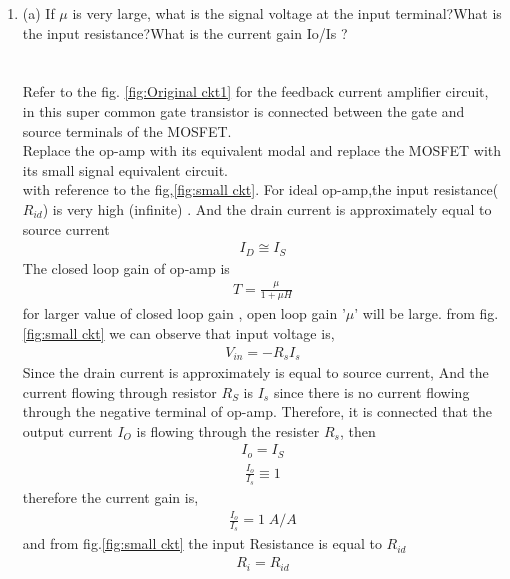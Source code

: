 \begin{enumerate}[label=\thesection.\arabic*.,ref=\thesection.\theenumi]
\item 
\label{Question_1a_ee18btech11023}
(a) If $\mu$ is very large, what is the signal voltage at the input
terminal?What is the input resistance?What is the current
gain Io/Is ?\\
\\
\solution \\
Refer to the fig. \ref{fig:Original ckt1} for the feedback current amplifier circuit, in this super common gate transistor is connected between the gate and source terminals of the MOSFET.\\
Replace the op-amp with its equivalent modal and replace the MOSFET with its small signal equivalent circuit.\\
with reference to the fig,\ref{fig:small ckt}. For ideal op-amp,the input resistance($R_{id}$) is very high (infinite) . And the drain current is approximately equal to source current
\begin{align}
    I_{D} \cong  I_{S}
\label{eq_ee18btech11023_1}
\end{align}
The closed loop gain of op-amp is
\begin{align}
    T = \frac{\mu}{1 + \mu H}
    \label{eq_ee18btech11023_2}
\end{align}
for larger value of closed loop gain , open loop gain '$\mu$' will be large. 
from fig.\ref{fig:small ckt} we can observe that input voltage is,
\begin{align}
    V_{in} = -R_sI_s
    \label{eq_ee18btech11023_3}
\end{align}
Since the drain current is approximately is equal to source current, And the current flowing through resistor $R_S$ is $I_s$ since there is no current flowing through the negative terminal of  op-amp. Therefore, it is connected that the output current $I_O$ is flowing through the resister $R_s$, then
\begin{align}
    I_o = I_S
    \label{eq_ee18btech11023_4}
\end{align}
\begin{align*}
    \frac{I_o}{I_s} \equiv 1 
\end{align*}
therefore the current gain is,
\begin{align}
    \frac{I_o}{I_s} = 1 \; A/A
    \label{eq_ee18btech11023_5}
\end{align}
and from fig.\ref{fig:small ckt} the input Resistance is equal to $R_{id}$
\begin{align}
    R_{i} = R_{id}
    \label{eq_ee18btech11023_6}
\end{align}


\end{enumerate}

